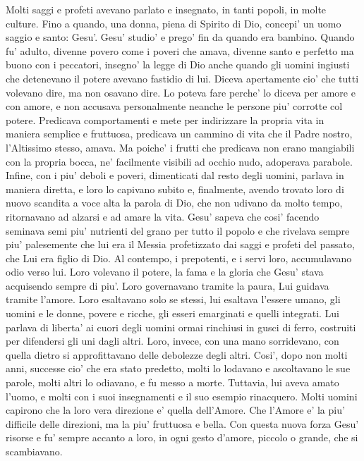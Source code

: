 {  Molti saggi e profeti avevano parlato e insegnato, in tanti popoli, in molte culture. Fino a quando, una donna, piena di Spirito di Dio, concepi' un uomo saggio e santo: Gesu'. Gesu' studio' e prego' fin da quando era bambino. Quando fu' adulto, divenne povero come i poveri che amava, divenne santo e perfetto ma buono con i peccatori, insegno' la legge di Dio anche quando gli uomini ingiusti che detenevano il potere avevano fastidio di lui. Diceva apertamente cio' che tutti volevano dire, ma non osavano dire. Lo poteva fare perche' lo diceva per amore e con amore, e non accusava personalmente neanche le persone piu' corrotte col potere. Predicava comportamenti e mete per indirizzare la propria vita in maniera semplice e fruttuosa, predicava un cammino di vita che il Padre nostro, l'Altissimo stesso, amava. Ma poiche' i frutti che predicava non erano mangiabili con la propria bocca, ne' facilmente visibili ad occhio nudo, adoperava parabole. Infine, con i piu' deboli e poveri, dimenticati dal resto degli uomini, parlava in maniera diretta, e loro lo capivano subito e, finalmente, avendo trovato loro di nuovo scandita a voce alta la parola di Dio, che non udivano da molto tempo, ritornavano ad alzarsi e ad amare la vita.
  Gesu' sapeva che cosi' facendo seminava semi piu' nutrienti del grano per tutto il popolo e che rivelava sempre piu' palesemente che lui era il Messia profetizzato dai saggi e profeti del passato, che Lui era figlio di Dio. Al contempo, i prepotenti, e i servi loro, accumulavano odio verso lui. Loro volevano il potere, la fama e la gloria che Gesu' stava acquisendo sempre di piu'. Loro governavano tramite la paura, Lui guidava tramite l'amore. Loro esaltavano solo se stessi, lui esaltava l'essere umano, gli uomini e le donne, povere e ricche, gli esseri emarginati e quelli integrati. Lui parlava di liberta' ai cuori degli uomini ormai rinchiusi in gusci di ferro, costruiti per difendersi gli uni dagli altri. Loro, invece, con una mano sorridevano, con quella dietro si approfittavano delle debolezze degli altri.
  Cosi', dopo non molti anni, successe cio' che era stato predetto, molti lo lodavano e ascoltavano le sue parole, molti altri lo odiavano, e fu messo a morte.
  Tuttavia, lui aveva amato l'uomo, e molti con i suoi insegnamenti e il suo esempio rinacquero. Molti uomini capirono che la loro vera direzione e' quella dell'Amore. Che l'Amore e' la piu' difficile delle direzioni, ma la piu' fruttuosa e bella. Con questa nuova forza Gesu' risorse e fu' sempre accanto a loro, in ogni gesto d'amore, piccolo o grande, che si scambiavano.
}
